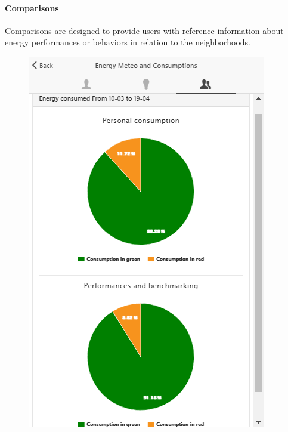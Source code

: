 \paragraph{Comparisons} 
Comparisons are designed to provide users with reference information about energy performances or behaviors in relation to the neighborhoods.
\begin{figure}[htb]
      \begin{center}
        \begin{minipage}[htb]{0.45\linewidth}    
         \includegraphics[width=1\linewidth]{img/touperformancechart_indivcoll.png}
        \end{minipage}
         \begin{minipage}[htb]{0.45\linewidth}    

\end{minipage}
\end{center}
\end{figure}
